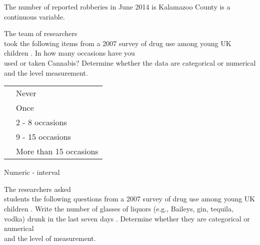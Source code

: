 \documentclass[11pt]{book}\usepackage[]{graphicx}\usepackage[]{color}
\begin{document}
\begin{exercises}
\begin{solution}
	  The number of reported robberies in June 2014 is Kalamazoo County is a continuous variable.
	  
	\end{solution}

	\begin{exercise}  %

	The team of researchers \\ took the following items from a 2007 survey of drug use among young UK children \cite{Teen2007}.  In how many occasions have you \\ used or taken Cannabis?  Determine whether the data are categorical or numerical and the level measurement.


{\small{
  \begin{table}[htbp]
   \centering
  \begin{tabular}{@{} rl @{}} \hline %
    \underline{ \phantom{xxx} } & Never \\
    \underline{ \phantom{xxx} } & Once \\
    \underline{ \phantom{xxx} } & 2 - 8 occasions \\
    \underline{ \phantom{xxx} } & 9 - 15 occasions \\
    \underline{ \phantom{xxx} } & More than 15 occasions \\ \hline
   \end{tabular}
   \end{table}
}}

    \vspace{4mm}


  \end{exercise}
  \vspace{2mm}
  \begin{solution}   %

    Numeric - interval

  \end{solution}

	\begin{exercise}  %

	The researchers asked \\ students the following questions from a 2007 survey of drug use among young UK children  \cite{Teen2007}.
	Write the number of glasses of liquors (e.g., Baileys, gin, tequila, vodka) drunk in the last seven days   \underline{\phantom{xxxx}}.
	 Determine whether they are categorical or numerical \\ and the level of measurement.


\end{exercise}
\end{exercises}
\end{document}
